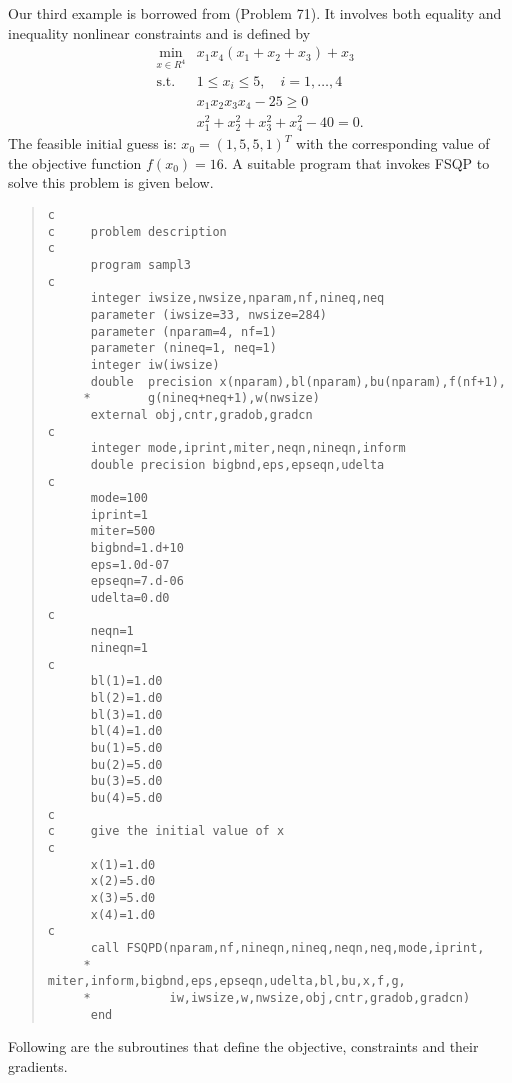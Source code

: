 Our third example is borrowed 
from\Lspace {}\Rcitemark \Rspace{} (Problem 71). It involves both
equality and inequality nonlinear constraints and is defined by
$$\begin{array}{cl}
\min\limits_{x\in R^4} & x_1x_4(x_1+x_2+x_3)+x_3\\
\mbox{s.t.} & 1\leq x_i\leq 5,\quad i=1,\ldots,4\\
            & x_1x_2x_3x_4-25\geq 0\\
            & x_1^2+x_2^2+x_3^2+x_4^2-40=0.
\end{array}$$
The feasible initial guess is: $x_0=(1,5,5,1)^T$ with the corresponding
value of the objective function $f(x_0)=16$. A suitable program
that invokes FSQP to solve this problem is given below.
\begin{quote}
\begin{verbatim}
c
c     problem description
c
      program sampl3
c
      integer iwsize,nwsize,nparam,nf,nineq,neq
      parameter (iwsize=33, nwsize=284)
      parameter (nparam=4, nf=1)
      parameter (nineq=1, neq=1)
      integer iw(iwsize)
      double  precision x(nparam),bl(nparam),bu(nparam),f(nf+1),
     *        g(nineq+neq+1),w(nwsize)
      external obj,cntr,gradob,gradcn
c
      integer mode,iprint,miter,neqn,nineqn,inform
      double precision bigbnd,eps,epseqn,udelta
c
      mode=100
      iprint=1
      miter=500
      bigbnd=1.d+10
      eps=1.0d-07
      epseqn=7.d-06
      udelta=0.d0
c
      neqn=1
      nineqn=1
c
      bl(1)=1.d0
      bl(2)=1.d0
      bl(3)=1.d0
      bl(4)=1.d0
      bu(1)=5.d0
      bu(2)=5.d0
      bu(3)=5.d0
      bu(4)=5.d0
c
c     give the initial value of x
c
      x(1)=1.d0
      x(2)=5.d0
      x(3)=5.d0
      x(4)=1.d0
c
      call FSQPD(nparam,nf,nineqn,nineq,neqn,neq,mode,iprint,
     *           miter,inform,bigbnd,eps,epseqn,udelta,bl,bu,x,f,g,
     *           iw,iwsize,w,nwsize,obj,cntr,gradob,gradcn)
      end
\end{verbatim}
\end{quote}
Following are the subroutines that define the objective, constraints
and their gradients.
